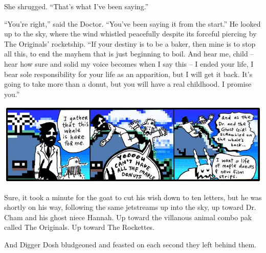\documentclass[10pt,twoside]{report}
\begin{document}
She shrugged.  ``That's what I've been saying.''

``You're right,'' said the Doctor.  ``You've been saying it from the
start.''  He looked up to the sky, where the wind whistled peacefully
despite its forceful piercing by The Originals' rocketship.  ``If your
destiny is to be a baker, then mine is to stop all this, to end the
mayhem that is just beginning to boil.  And hear me, child -- hear how
sure and solid my voice becomes when I say this -- I ended your life,
I bear sole responsibility for your life as an apparition, but I will
get it back.  It's going to take more than a donut, but you will have
a real childhood.  I promise you.''

	\includegraphics[width=1.0\textwidth]{cache/54.png}

Sure, it took a minute for the goat to cut his wish down to ten
letters, but he was shortly on his way, following the same jetstreams
up into the sky, up toward Dr. Cham and his ghost niece Hannah.  Up
toward the villanous animal combo pak called The Originals.  Up toward
The Rockettes.

And Digger Dosh bludgeoned and feasted on each second they left behind
them.
\newpage
\thispagestyle{empty}
\mbox{}
\cleartooddpage
\end{document}
